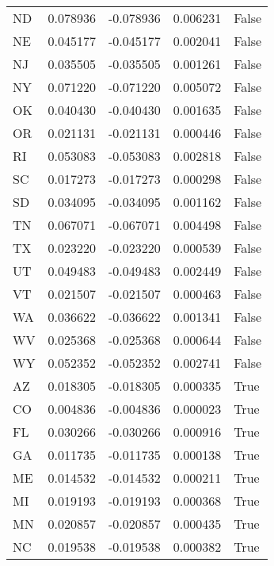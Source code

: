 \begin{table}
\begin{tabular}{lrrrl}
      ND &   0.078936 & -0.078936 &       0.006231 &         False \\
      NE &   0.045177 & -0.045177 &       0.002041 &         False \\
      NJ &   0.035505 & -0.035505 &       0.001261 &         False \\
      NY &   0.071220 & -0.071220 &       0.005072 &         False \\
      OK &   0.040430 & -0.040430 &       0.001635 &         False \\
      OR &   0.021131 & -0.021131 &       0.000446 &         False \\
      RI &   0.053083 & -0.053083 &       0.002818 &         False \\
      SC &   0.017273 & -0.017273 &       0.000298 &         False \\
      SD &   0.034095 & -0.034095 &       0.001162 &         False \\
      TN &   0.067071 & -0.067071 &       0.004498 &         False \\
      TX &   0.023220 & -0.023220 &       0.000539 &         False \\
      UT &   0.049483 & -0.049483 &       0.002449 &         False \\
      VT &   0.021507 & -0.021507 &       0.000463 &         False \\
      WA &   0.036622 & -0.036622 &       0.001341 &         False \\
      WV &   0.025368 & -0.025368 &       0.000644 &         False \\
      WY &   0.052352 & -0.052352 &       0.002741 &         False \\
      AZ &   0.018305 & -0.018305 &       0.000335 &          True \\
      CO &   0.004836 & -0.004836 &       0.000023 &          True \\
      FL &   0.030266 & -0.030266 &       0.000916 &          True \\
      GA &   0.011735 & -0.011735 &       0.000138 &          True \\
      ME &   0.014532 & -0.014532 &       0.000211 &          True \\
      MI &   0.019193 & -0.019193 &       0.000368 &          True \\
      MN &   0.020857 & -0.020857 &       0.000435 &          True \\
      NC &   0.019538 & -0.019538 &       0.000382 &          True \\

\end{tabular}
\end{table}
